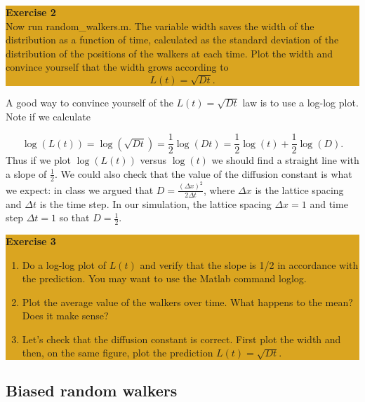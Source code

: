 \documentclass[12pt]{amsart}
\begin{document}




\bigskip
\begin{center}
\colorbox{Goldenrod}{\parbox{15cm}{
{
\textbf{\large Exercise 2}\vspace{1mm} \\
Now run random\_walkers.m.  The variable width saves the width of the distribution as a function of time, calculated as the standard deviation of the distribution of the positions of the walkers at each time.  Plot the width and convince yourself that the width grows according to 
\[
L(t) = \sqrt{D t}.
\]
 }}}
\end{center}
\bigskip

\noindent A good way to convince yourself of the $L(t) = \sqrt{D t}$ law is to use a log-log plot.  Note if we calculate

\[
\log(L(t)) = \log(\sqrt{D t}) = \frac{1}{2} \log(D t) = \frac{1}{2} \log(t) + \frac{1}{2} \log (D).
\]
Thus if we plot $\log(L(t))$ versus $\log(t)$ we should find a straight line with a slope of $\frac{1}{2}$.   We could also check that the value of the diffusion constant is what we expect: in class we argued that $D = \frac{(\Delta x)^2}{2 \Delta t}$, where $\Delta x$ is the lattice spacing and $\Delta t$ is the time step.  In our simulation,  the lattice spacing $\Delta x = 1$ and time step $\Delta t = 1$ so that $D = \frac{1}{2}$.
\bigskip

\begin{center}
\colorbox{Goldenrod}{\parbox{15cm}{
{
\textbf{\large Exercise 3}\vspace{1mm} 
\begin{enumerate}
\item Do a log-log plot of $L(t)$ and verify that the slope is 1/2 in accordance with the prediction.  You may want to use the Matlab command loglog.  
\item Plot the average value of the walkers over time.  What happens to the mean?  Does it make sense?
\item Let's check that the diffusion constant is correct.  First plot the width and then, on the same figure, plot the prediction $L(t) = \sqrt{D t}$.
\end{enumerate}
 }}}
 \end{center}
 
 \subsection{Biased random walkers}
 
\end{document}
